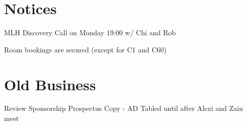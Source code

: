 \documentclass[11pt,hacksoc]{meetingmins}
\begin{document}
\maketitle

\section{Notices}
\begin{items}
  \item MLH Discovery Call on Monday 19:00 w/ Chi and Rob
  \item Room bookings are secured (except for C1 and C60)
\end{items}

\section{Old Business}
\begin{items}
  \item Review Sponsorship Prospectus Copy - AD
    \subitem Tabled until after Alexi and Zain meet
\end{items}
\end{document}
